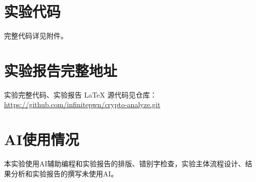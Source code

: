 \section{实验代码}
完整代码详见附件。

\section{实验报告完整地址}
实验完整代码、实验报告 \LaTeX{} 源代码见仓库：
\url{https://github.com/infinitepwn/crypto-analyze.git}


\section{AI使用情况}
本实验使用AI辅助编程和实验报告的排版、错别字检查，实验主体流程设计、结果分析和实验报告的撰写未使用AI。